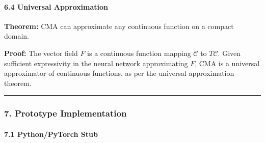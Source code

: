 \documentclass[
  11pt,
  a4paper,
]{article}
\begin{document}
\paragraph{6.4 Universal Approximation}\label{universal-approximation}

\textbf{Theorem:} CMA can approximate any continuous function on a
compact domain.

\textbf{Proof:} The vector field \(F\) is a continuous function mapping
\(\mathcal{C}\) to \(T\mathcal{C}\). Given sufficient expressivity in
the neural network approximating \(F\), CMA is a universal approximator
of continuous functions, as per the universal approximation theorem.

\begin{center}\rule{0.5\linewidth}{0.5pt}\end{center}

\subsubsection{7. Prototype
Implementation}\label{prototype-implementation}

\paragraph{7.1 Python/PyTorch Stub}\label{pythonpytorch-stub}
\end{document}
